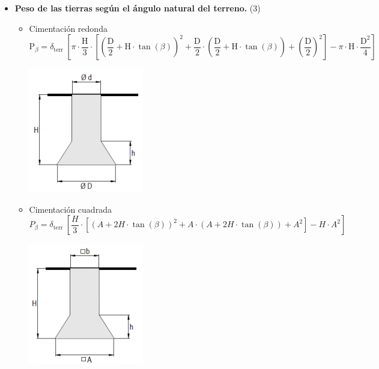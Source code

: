 \documentclass{article}
\begin{document}
\begin{itemize}
                \newpage
                \item\textbf{ Peso de las tierras según el ángulo natural del terreno.} (3)
                \begin{itemize}
                        \item Cimentación redonda
                        \begin{equation*}
                        \mathrm{P}_{\beta}= \delta_{\text {terr }}\left[\pi \cdot \frac{\mathrm{H}}{3} \cdot\left[\left(\frac{\mathrm{D}}{2}+\mathrm{H} \cdot \tan (\beta)\right)^{2}+\frac{\mathrm{D}}{2} \cdot\left(\frac{\mathrm{D}}{2}+\mathrm{H} \cdot \tan (\beta)\right)+\left(\frac{\mathrm{D}}{2}\right)^{2}\right]-\pi \cdot \mathrm{H} \cdot \frac{\mathrm{D}^{2}}{4}\right]
                        \end{equation*}
                        \begin{center}
                            \includegraphics[scale = 0.5]{assets/img/Patas Separadas/cimentacion circular.png}
                        \end{center}
                        \item Cimentación cuadrada
                         \begin{equation*}
                            P_\beta= \delta_{\text {terr }}\left[\frac{H}{3} \cdot\left[(A+2H \cdot \tan (\beta))^{2}+A \cdot(A+2 H \cdot \tan (\beta))+A^{2}\right]-H \cdot A^{2}\right]
                        \end{equation*}
                        \begin{center}
                            \includegraphics[scale = 0.5]{assets/img/Patas Separadas/cimentacion cuadrada.png}

\end{center}
\end{itemize}
\end{itemize}
\end{document}
